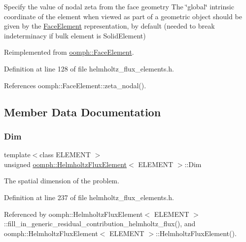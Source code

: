 Specify the value of nodal zeta from the face geometry The \char`\"{}global\char`\"{} intrinsic coordinate of the element when viewed as part of a geometric object should be given by the \hyperlink{classoomph_1_1FaceElement}{Face\+Element} representation, by default (needed to break indeterminacy if bulk element is Solid\+Element) 



Reimplemented from \hyperlink{classoomph_1_1FaceElement_a58c9f93705c7741f76c8487d152e68a6}{oomph\+::\+Face\+Element}.



Definition at line 128 of file helmholtz\+\_\+flux\+\_\+elements.\+h.



References oomph\+::\+Face\+Element\+::zeta\+\_\+nodal().



\subsection{Member Data Documentation}
\mbox{\label{classoomph_1_1HelmholtzFluxElement_a5d1b709d1f2120ca7a8429bc0260bcc0}} 
\subsubsection{\texorpdfstring{Dim}{Dim}}
{\footnotesize\ttfamily template$<$class E\+L\+E\+M\+E\+NT $>$ \\
unsigned \hyperlink{classoomph_1_1HelmholtzFluxElement}{oomph\+::\+Helmholtz\+Flux\+Element}$<$ E\+L\+E\+M\+E\+NT $>$\+::Dim\hspace{0.3cm}{\ttfamily [protected]}}



The spatial dimension of the problem. 



Definition at line 237 of file helmholtz\+\_\+flux\+\_\+elements.\+h.



Referenced by oomph\+::\+Helmholtz\+Flux\+Element$<$ E\+L\+E\+M\+E\+N\+T $>$\+::fill\+\_\+in\+\_\+generic\+\_\+residual\+\_\+contribution\+\_\+helmholtz\+\_\+flux(), and oomph\+::\+Helmholtz\+Flux\+Element$<$ E\+L\+E\+M\+E\+N\+T $>$\+::\+Helmholtz\+Flux\+Element().

